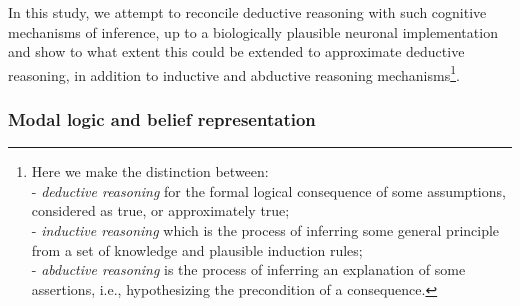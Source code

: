 \documentclass[sn-mathphys]{sn-jnl}
\begin{document}
In this study, we attempt to reconcile deductive reasoning with such cognitive mechanisms of inference, up to a biologically plausible neuronal implementation and show to what extent this could be extended to approximate deductive reasoning, in addition to inductive and abductive reasoning mechanisms\footnote{Here we make the distinction between:
\\- {\em deductive reasoning} for the formal logical consequence of some assumptions, considered as true, or approximately true;
\\- {\em inductive reasoning} which is the process of inferring some general principle from a set of knowledge and plausible induction rules;
\\- {\em abductive reasoning} is the process of inferring an explanation of some assertions, i.e., hypothesizing the precondition of a consequence.}.

\subsubsection{Modal logic and belief representation}
\end{document}
